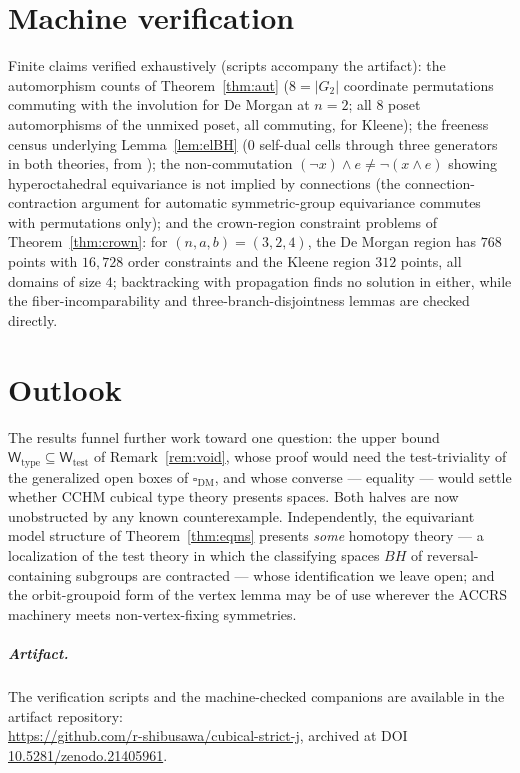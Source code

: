 \documentclass[11pt]{amsart}
\theoremstyle{definition}
\newcommand{\cube}{\square_{\mathrm{DM}}}
\newcommand{\G}{G}
\newcommand{\Wtest}{\mathsf{W}_{\mathrm{test}}}
\newcommand{\Wtype}{\mathsf{W}_{\mathrm{type}}}
\begin{document}
\section{Machine verification}
\label{sec:machine}

Finite claims verified exhaustively (scripts accompany the
artifact): the automorphism counts of Theorem~\ref{thm:aut}
($8 = |\G_2|$ coordinate permutations commuting with the
involution for De Morgan at $n = 2$; all $8$ poset automorphisms
of the unmixed poset, all commuting, for Kleene); the freeness
census underlying Lemma~\ref{lem:elBH} ($0$ self-dual cells
through three generators in both theories, from
\cite{Reversal}); the non-commutation
$(\neg x) \wedge e \neq \neg(x \wedge e)$ showing
hyperoctahedral equivariance is not implied by connections (the
connection-contraction argument for automatic symmetric-group
equivariance \cite[Rem.~4.25]{CavalloSattlerElegance} commutes
with permutations only); and the crown-region constraint
problems of Theorem~\ref{thm:crown}: for
$(n, a, b) = (3, 2, 4)$, the De Morgan region has $768$ points
with $16{,}728$ order constraints and the Kleene region $312$
points, all domains of size $4$; backtracking with propagation
finds no solution in either, while the fiber-incomparability and
three-branch-disjointness lemmas are checked directly.

\section{Outlook}
\label{sec:outlook}

The results funnel further work toward one question: the upper
bound $\Wtype \subseteq \Wtest$ of Remark~\ref{rem:void}, whose
proof would need the test-triviality of the generalized open boxes
of $\cube$, and whose converse --- equality --- would settle
whether CCHM cubical type theory presents spaces.  Both halves are
now unobstructed by any known counterexample.  Independently, the
equivariant model structure of Theorem~\ref{thm:eqms} presents
\emph{some} homotopy theory --- a localization of the test theory
in which the classifying spaces $BH$ of reversal-containing
subgroups are contracted --- whose identification we leave open;
and the orbit-groupoid form of the vertex lemma may be of use
wherever the ACCRS machinery meets non-vertex-fixing symmetries.

\subparagraph*{Artifact.}  The verification scripts and the
machine-checked companions are available in the artifact
repository:\\
\url{https://github.com/r-shibusawa/cubical-strict-j}, archived
at DOI \href{https://doi.org/10.5281/zenodo.21405961}%
{10.5281/zenodo.21405961}.
\end{document}
